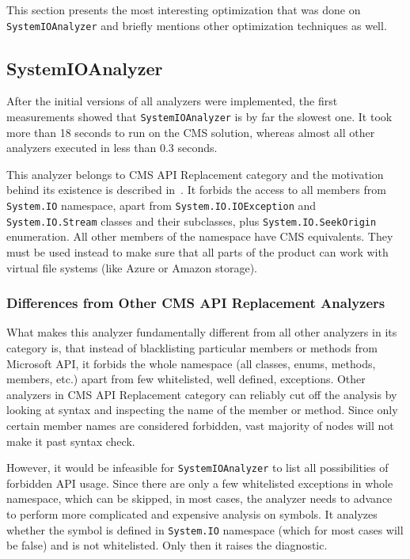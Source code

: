 \documentclass[
  digital, %
  table,   %
  lof,     %
  lot,     %
  oneside,
]{fithesis3}
\begin{document}
This section presents the most interesting optimization that was done on \texttt{SystemIOAnalyzer} and briefly mentions other optimization techniques as well.

\subsection{SystemIOAnalyzer}
After the initial versions of all analyzers were implemented, the first measurements showed that \texttt{SystemIOAnalyzer} is by far the slowest one. It took more than 18 seconds to run on the CMS solution, whereas almost all other analyzers executed in less than 0.3 seconds.

This analyzer belongs to CMS API Replacement category and the motivation behind its existence is described in~\cite{system-io-motivation}. It forbids the access to all members from \texttt{System.IO} namespace, apart from \texttt{System.IO.IOException} and \texttt{System.IO.Stream} classes and their subclasses, plus \texttt{System.IO.SeekOrigin} enumeration. All other members of the namespace have CMS equivalents. They must be used instead to make sure that all parts of the product can work with virtual file systems (like  Azure or Amazon storage).

\subsubsection{\textbf{Differences from Other CMS API Replacement Analyzers}}
What makes this analyzer fundamentally different from all other analyzers in its category is, that instead of blacklisting particular members or methods from Microsoft API, it forbids the whole namespace (all classes, enums, methods, members, etc.) apart from few whitelisted, well defined, exceptions. Other analyzers in CMS API Replacement category can reliably cut off the analysis by looking at syntax and inspecting the name of the member or method. Since only certain member names are considered forbidden, vast majority of nodes will not make it past syntax check. 

However, it would be infeasible for \texttt{SystemIOAnalyzer} to list all possibilities of forbidden API usage. Since there are only a few whitelisted exceptions in whole namespace, which can be skipped, in most cases, the analyzer needs to advance to perform more complicated and expensive analysis on symbols. It analyzes whether the symbol is defined in \texttt{System.IO} namespace (which for most cases will be false) and is not whitelisted. Only then it raises the diagnostic.
\end{document}
